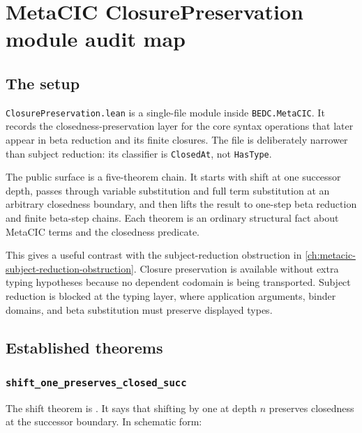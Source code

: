 \chapter{MetaCIC ClosurePreservation module audit map}
\label{ch:metacic-closure-preservation-audit-map}

\section{The setup}
\label{sec:metacic-closure-preservation-audit-map-setup}

\texttt{ClosurePreservation.lean} is a single-file module inside
\texttt{BEDC.MetaCIC}. It records the closedness-preservation layer for the
core syntax operations that later appear in beta reduction and its finite
closures. The file is deliberately narrower than subject reduction: its
classifier is \texttt{ClosedAt}, not \texttt{HasType}.

The public surface is a five-theorem chain. It starts with shift at one
successor depth, passes through variable substitution and full term
substitution at an arbitrary closedness boundary, and then lifts the result to
one-step beta reduction and finite beta-step chains. Each theorem is an
ordinary structural fact about MetaCIC terms and the closedness predicate.

This gives a useful contrast with the subject-reduction obstruction in
\autoref{ch:metacic-subject-reduction-obstruction}. Closure preservation is
available without extra typing hypotheses because no dependent codomain is
being transported. Subject reduction is blocked at the typing layer, where
application arguments, binder domains, and beta substitution must preserve
displayed types.

\section{Established theorems}
\label{sec:metacic-closure-preservation-audit-map-established-theorems}

\subsection{\texttt{shift\_one\_preserves\_closed\_succ}}
\label{subsec:metacic-closure-preservation-audit-map-shift-one}

The shift theorem is
.
It says that shifting by one at depth $n$ preserves closedness at the
successor boundary. In schematic form:

